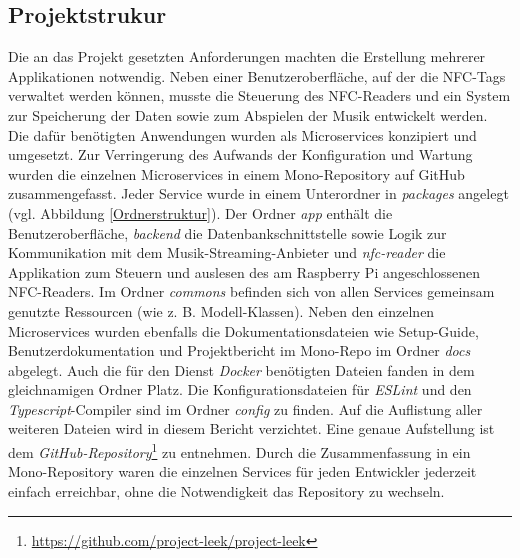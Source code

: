 \documentclass[10pt, a4paper]{article}
\begin{document}
\begin{onehalfspace}
  \subsection{Projektstrukur}
  \label{Ordnerstruktur}
  Die an das Projekt gesetzten Anforderungen machten die Erstellung mehrerer Applikationen notwendig. Neben einer Benutzeroberfläche, auf der die NFC-Tags
  verwaltet werden können, musste die Steuerung des NFC-Readers und ein System zur Speicherung der Daten sowie zum Abspielen der Musik entwickelt werden.
  Die dafür benötigten Anwendungen wurden als Microservices konzipiert und umgesetzt. Zur Verringerung des Aufwands der Konfiguration und Wartung wurden die einzelnen Microservices in einem Mono-Repository auf GitHub zusammengefasst.
  Jeder Service wurde in einem Unterordner in \textit{packages} angelegt (vgl. Abbildung \ref*{Ordnerstruktur}). Der Ordner \textit{app} enthält die Benutzeroberfläche,
  \textit{backend} die Datenbankschnittstelle sowie Logik zur Kommunikation mit dem Musik-Streaming-Anbieter und \textit{nfc-reader} die Applikation zum Steuern und auslesen des am Raspberry Pi angeschlossenen NFC-Readers.
  Im Ordner \textit{commons} befinden sich von allen Services gemeinsam genutzte Ressourcen (wie z. B. Modell-Klassen).
  Neben den einzelnen Microservices wurden ebenfalls die Dokumentationsdateien wie Setup-Guide, Benutzerdokumentation und Projektbericht im Mono-Repo im Ordner \textit{docs} abgelegt.
  Auch die für den Dienst \textit{Docker} benötigten Dateien fanden in dem gleichnamigen Ordner Platz. Die Konfigurationsdateien für \textit{ESLint} und den \textit{Typescript}-Compiler sind im Ordner \textit{config} zu finden.
  Auf die Auflistung aller weiteren Dateien wird in diesem Bericht verzichtet. Eine genaue Aufstellung ist dem \textit{GitHub-Repository}\footnote{\url{https://github.com/project-leek/project-leek}} zu entnehmen.
  Durch die Zusammenfassung in ein Mono-Repository waren die einzelnen Services für jeden Entwickler jederzeit einfach erreichbar, ohne die Notwendigkeit das Repository zu wechseln.


\end{onehalfspace}
\end{document}
